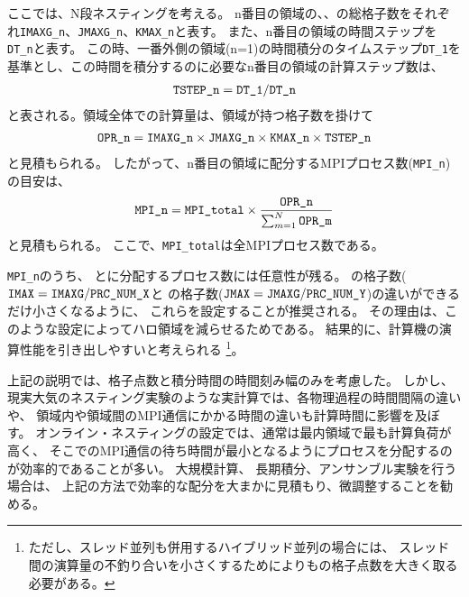 ここでは、N段ネスティングを考える。
n番目の領域の{\XDIR}、{\YDIR}、{\ZDIR}の総格子数をそれぞれ\verb|IMAXG_n|、\verb|JMAXG_n|、\verb|KMAX_n|と表す。
また、n番目の領域の時間ステップを\verb|DT_n|と表す。
この時、一番外側の領域(n=1)の時間積分のタイムステップ\verb|DT_1|を基準とし、この時間を積分するのに必要なn番目の領域の計算ステップ数は、
\begin{eqnarray}
 \verb|TSTEP_n| = \verb|DT_1| / \verb|DT_n|  \nonumber
\end{eqnarray}
と表される。領域全体での計算量は、領域が持つ格子数を掛けて
\begin{eqnarray}
 \verb|OPR_n| = \verb|IMAXG_n| \times \verb|JMAXG_n| \times \verb|KMAX_n| \times \verb|TSTEP_n| \nonumber
\end{eqnarray}
と見積もられる。
したがって、n番目の領域に配分するMPIプロセス数(\verb|MPI_n|)の目安は、
\begin{eqnarray}
 \verb|MPI_n| = \verb|MPI_total| \times \frac{ \texttt{OPR\_n} }{ \sum_{m=1}^N \texttt{OPR\_m} }
\end{eqnarray}
と見積もられる。
ここで、\verb|MPI_total|は全MPIプロセス数である。


\verb|MPI_n|のうち、{\XDIR} と{\YDIR}に分配するプロセス数には任意性が残る。
\XDIR の格子数($\nmitemeq{IMAX}=\nmitemeq{IMAXG}/\nmitemeq{PRC_NUM_X}$と
\YDIR の格子数($\nmitemeq{JMAX}=\nmitemeq{JMAXG}/\nmitemeq{PRC_NUM_Y}$)の違いができるだけ小さくなるように、
これらを設定することが推奨される。
その理由は、このような設定によってハロ領域を減らせるためである。
結果的に、計算機の演算性能を引き出しやすいと考えられる
\footnote{ただし、スレッド並列も併用するハイブリッド並列の場合には、
スレッド間の演算量の不釣り合いを小さくするために{\XDIR}よりも{\YDIR}の格子点数を大きく取る必要がある。}。


上記の説明では、格子点数と積分時間の時間刻み幅のみを考慮した。
しかし、現実大気のネスティング実験のような実計算では、各物理過程の時間間隔の違いや、
領域内や領域間のMPI通信にかかる時間の違いも計算時間に影響を及ぼす。
オンライン・ネスティングの設定では、通常は最内領域で最も計算負荷が高く、
そこでのMPI通信の待ち時間が最小となるようにプロセスを分配するのが効率的であることが多い。
大規模計算、 長期積分、アンサンブル実験を行う場合は、
上記の方法で効率的な配分を大まかに見積もり、微調整することを勧める。
